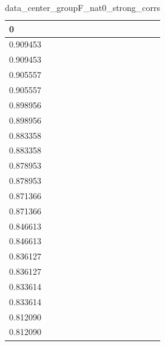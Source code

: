 \begin{table}
\caption{data_center_groupF_nat0_strong_corrs}
\label{tab:data_summary}
\begin{tabular}{lcr}
\toprule
0 \\
\midrule
0.909453 \\
0.909453 \\
0.905557 \\
0.905557 \\
0.898956 \\
0.898956 \\
0.883358 \\
0.883358 \\
0.878953 \\
0.878953 \\
0.871366 \\
0.871366 \\
0.846613 \\
0.846613 \\
0.836127 \\
0.836127 \\
0.833614 \\
0.833614 \\
0.812090 \\
0.812090 \\
\bottomrule
\end{tabular}
\end{table}
